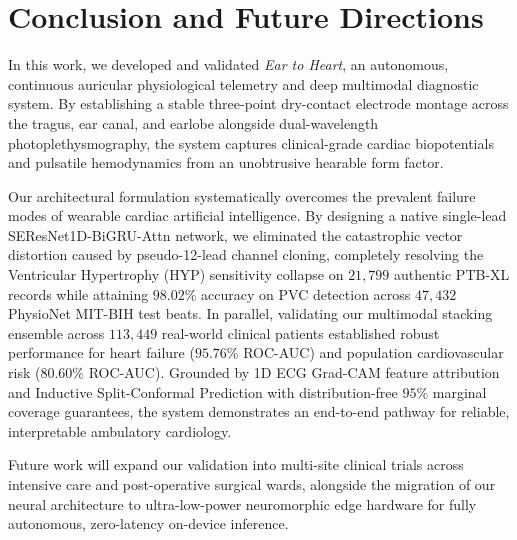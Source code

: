 \section{Conclusion and Future Directions}
\label{sec:conclusion}

In this work, we developed and validated \textit{Ear to Heart}, an autonomous, continuous auricular physiological telemetry and deep multimodal diagnostic system. By establishing a stable three-point dry-contact electrode montage across the tragus, ear canal, and earlobe alongside dual-wavelength photoplethysmography, the system captures clinical-grade cardiac biopotentials and pulsatile hemodynamics from an unobtrusive hearable form factor.

Our architectural formulation systematically overcomes the prevalent failure modes of wearable cardiac artificial intelligence. By designing a native single-lead \mbox{SEResNet1D-BiGRU-Attn} network, we eliminated the catastrophic vector distortion caused by pseudo-12-lead channel cloning, completely resolving the Ventricular Hypertrophy (HYP) sensitivity collapse on $21,799$ authentic PTB-XL records while attaining $98.02\%$ accuracy on PVC detection across $47,432$ PhysioNet MIT-BIH test beats. In parallel, validating our multimodal stacking ensemble across $113,449$ real-world clinical patients established robust performance for heart failure ($95.76\%$ ROC-AUC) and population cardiovascular risk ($80.60\%$ ROC-AUC). Grounded by 1D ECG Grad-CAM feature attribution and Inductive Split-Conformal Prediction with distribution-free $95\%$ marginal coverage guarantees, the system demonstrates an end-to-end pathway for reliable, interpretable ambulatory cardiology.

Future work will expand our validation into multi-site clinical trials across intensive care and post-operative surgical wards, alongside the migration of our neural architecture to ultra-low-power neuromorphic edge hardware for fully autonomous, zero-latency on-device inference.

